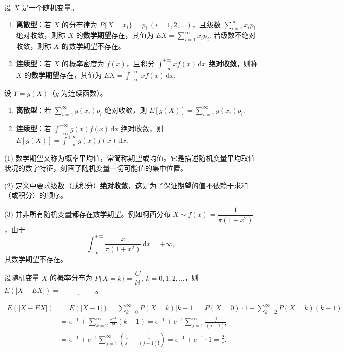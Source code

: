 \documentclass[lang=cn,11pt]{elegantbook}
\begin{document}
\begin{definition}[数学期望] \label{def:expectation}
设 \(X\) 是一个随机变量。
\begin{enumerate}
    \item \textbf{离散型}：若 \(X\) 的分布律为 \(P\{X=x_i\} = p_i\ (i=1,2,\dots)\)，且级数 \(\sum\limits_{i=1}^{\infty} x_i p_i\) 绝对收敛，则称 \(X\) 的\textbf{数学期望}存在，其值为
    \(
    EX = \sum_{i=1}^{\infty} x_i p_i.
    \)
    若级数不绝对收敛，则称 \(X\) 的数学期望不存在。
    \item \textbf{连续型}：若 \(X\) 的概率密度为 \(f(x)\)，且积分 \(\int_{-\infty}^{+\infty} x f(x)\,\mathrm{d}x\) \textbf{绝对收敛}，则称 \(X\) 的\textbf{数学期望}存在，其值为
    \(
    EX = \int_{-\infty}^{+\infty} x f(x)\,\mathrm{d}x.
    \)
\end{enumerate}
\end{definition}
\begin{definition}[随机变量函数的期望] \label{def:function-expectation}
设 \(Y = g(X)\)（\(g\) 为连续函数）。
\begin{enumerate}
    \item \textbf{离散型}：若 \(\sum\limits_{i=1}^{\infty} g(x_i) p_i\) 绝对收敛，则
    \(
    E[g(X)] = \sum_{i=1}^{\infty} g(x_i) p_i.
    \)
    \item \textbf{连续型}：若 \(\int_{-\infty}^{+\infty} g(x) f(x)\,\mathrm{d}x\) 绝对收敛，则
    \(
    E[g(X)] = \int_{-\infty}^{+\infty} g(x) f(x)\,\mathrm{d}x.
    \)
\end{enumerate}
\end{definition}

\begin{note}
(1) 数学期望又称为概率平均值，常简称期望或均值。它是描述随机变量平均取值状况的数字特征，刻画了随机变量一切可能值的集中位置。\par
(2) 定义中要求级数（或积分）\textbf{绝对收敛}，这是为了保证期望的值不依赖于求和（或积分）的顺序。\par
(3) 并非所有随机变量都存在数学期望。例如柯西分布 \(X\sim f(x)=\dfrac{1}{\pi(1+x^2)}\)，由于
\[
\int_{-\infty}^{+\infty}\frac{|x|}{\pi(1+x^2)}\,\mathrm{d}x = +\infty,
\]
其数学期望不存在。
\end{note}

\begin{exercise}\label{exer:4-5-poisson}
设随机变量 \(X\) 的概率分布为 \(P\{X=k\} = \dfrac{C}{k!},\ k=0,1,2,\dots\)，则 \(E(|X - EX|) =\,\underline{\hspace{2cm}}\)。
\end{exercise}
\begin{solution}
\[
\begin{aligned}
E(|X - EX|) &= E(|X - 1|) = \sum_{k=0}^{\infty} P(X=k)|k-1| = P(X=0) \cdot 1 + \sum_{k=2}^{\infty} P(X=k)(k-1) \\
&= e^{-1} + \sum_{k=2}^{\infty} \frac{e^{-1}}{k!}(k-1) = e^{-1} + e^{-1}\sum_{j=1}^{\infty}\frac{j}{(j+1)!} \\
&= e^{-1} + e^{-1}\sum_{j=1}^{\infty}\left(\frac{1}{j!} - \frac{1}{(j+1)!}\right) = e^{-1} + e^{-1}\cdot 1 = \frac{2}{e}.
\end{aligned}
\]
\end{solution}
\end{document}
